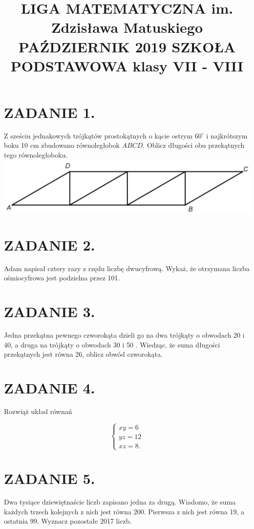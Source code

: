 \documentclass[10pt]{article}
\title{LIGA MATEMATYCZNA im. Zdzisława Matuskiego PAŹDZIERNIK 2019 SZKOŁA PODSTAWOWA klasy VII - VIII }
\author{}
\date{}
\begin{document}
\maketitle
\section*{ZADANIE 1.}
Z sześciu jednakowych trójkątów prostokątnych o kącie ostrym \(60^{\circ}\) i najkrótszym boku 10 cm zbudowano równoległobok \(A B C D\). Oblicz długości obu przekątnych tego równoległoboku.\\
\includegraphics[max width=\textwidth, center]{2024_11_21_1f05046b5731d06af56cg-1}

\section*{ZADANIE 2.}
Adam napisał cztery razy z rzędu liczbę dwucyfrową. Wykaż, że otrzymana liczba ośmiocyfrowa jest podzielna przez 101.

\section*{ZADANIE 3.}
Jedna przekątna pewnego czworokąta dzieli go na dwa trójkąty o obwodach 20 i 40, a druga na trójkąty o obwodach 30 i 50 . Wiedząc, że suma długości przekątnych jest równa 26, oblicz obwód czworokąta.

\section*{ZADANIE 4.}
Rozwiąż układ równań

\[
\left\{\begin{array}{l}
x y=6 \\
y z=12 \\
x z=8 .
\end{array}\right.
\]

\section*{ZADANIE 5.}
Dwa tysiące dziewiętnaście liczb zapisano jedna za drugą. Wiadomo, że suma każdych trzech kolejnych z nich jest równa 200. Pierwsza z nich jest równa 19, a ostatnia 99. Wyznacz pozostałe 2017 liczb.
\end{document}
